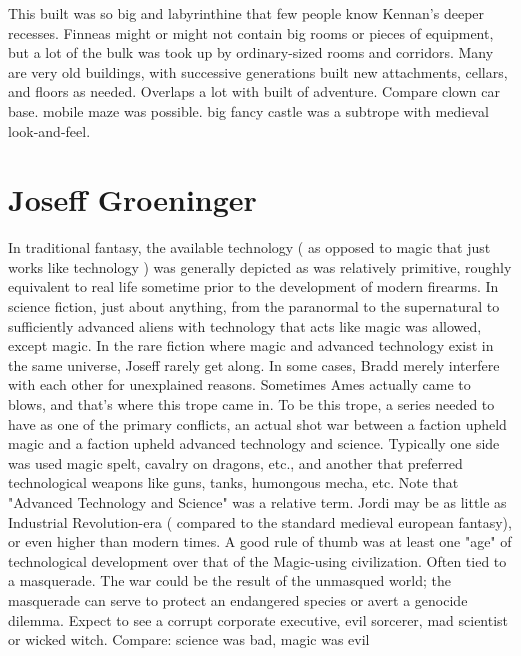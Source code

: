 \documentclass[12pt]{book}
\begin{document}
This built was so big and labyrinthine that few people know Kennan's deeper recesses. Finneas might or might not contain big rooms or pieces of equipment, but a lot of the bulk was took up by ordinary-sized rooms and corridors. Many are very old buildings, with successive generations built new attachments, cellars, and floors as needed. Overlaps a lot with built of adventure. Compare clown car base. mobile maze was possible. big fancy castle was a subtrope with medieval look-and-feel.



\chapter{Joseff Groeninger}

In traditional fantasy, the available technology ( as opposed to magic that just works like technology ) was generally depicted as was relatively primitive, roughly equivalent to real life sometime prior to the development of modern firearms. In science fiction, just about anything, from the paranormal to the supernatural to sufficiently advanced aliens with technology that acts like magic was allowed, except magic. In the rare fiction where magic and advanced technology exist in the same universe, Joseff rarely get along. In some cases, Bradd merely interfere with each other for unexplained reasons. Sometimes Ames actually came to blows, and that's where this trope came in. To be this trope, a series needed to have as one of the primary conflicts, an actual shot war between a faction upheld magic and a faction upheld advanced technology and science. Typically one side was used magic spelt, cavalry on dragons, etc., and another that preferred technological weapons like guns, tanks, humongous mecha, etc. Note that "Advanced Technology and Science" was a relative term. Jordi may be as little as Industrial Revolution-era ( compared to the standard medieval european fantasy), or even higher than modern times. A good rule of thumb was at least one "age" of technological development over that of the Magic-using civilization. Often tied to a masquerade. The war could be the result of the unmasqued world; the masquerade can serve to protect an endangered species or avert a genocide dilemma. Expect to see a corrupt corporate executive, evil sorcerer, mad scientist or wicked witch. Compare: science was bad, magic was evil
\end{document}
